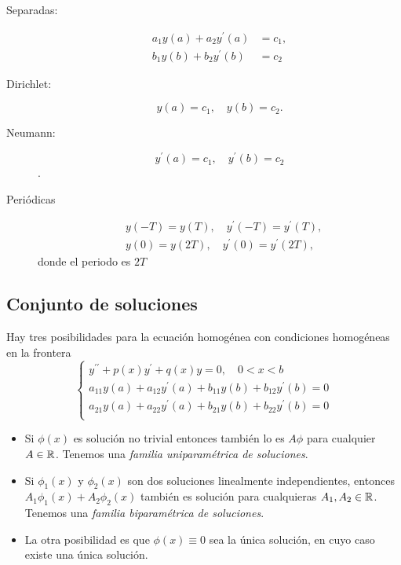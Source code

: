 \begin{description}
 \item[Separadas:]
 \[\begin{split}
    a_{1} y(a)+a_{2} y^{\prime}(a)&=c_{1},\\
    b_{1} y(b)+b_{2} y^{\prime}(b)&=c_{2}
   \end{split}
\]
\item[Dirichlet:] $$y(a)=c_{1},\quad y(b)=c_{2} .$$
\item[Neumann:] $$y^{\prime}(a)=c_{1},\quad y^{\prime}(b)=c_{2}$$.
\item[Periódicas] 
$$
\begin{aligned}
&y(-T)=y(T), \quad y^{\prime}(-T)=y^{\prime}(T), \\
&y(0)=y(2 T), \quad y^{\prime}(0)=y^{\prime}(2 T),
\end{aligned}
$$
donde el periodo es $2 T$
\end{description}



\subsection{Conjunto de soluciones}
 

Hay tres posibilidades para la ecuación homogénea con condiciones homogéneas en la frontera
\[
 \left\{
        \begin{array}{l}
            y^{\prime \prime}+p(x) y^{\prime}+q(x) y=0, \quad 0<x<b\\
            a_{11} y(a)+a_{12} y^{\prime}(a)+b_{11} y(b)+b_{12} y^{\prime}(b)=0\\
            a_{21} y(a)+a_{22} y^{\prime}(a)+b_{21} y(b)+b_{22} y^{\prime}(b)=0\\ 
         \end{array}
 \right.
\]

\begin{itemize}


\item Si $\phi(x)$ es solución no trivial  entonces también lo es $A \phi$ para cualquier  $A\in\mathbb{R}$. Tenemos una \emph{familia uniparamétrica de soluciones}.


\item Si $\phi_{1}(x)$ y $\phi_{2}(x)$ son  dos soluciones linealmente independientes, entonces $A_{1} \phi_{1}(x)+A_{2} \phi_{2}(x)$ también es solución para cualquieras  $A_{1}, A_{2}\in\mathbb{R}$. Tenemos una \emph{familia biparamétrica de soluciones}.


\item La otra posibilidad es que $\phi(x) \equiv 0$ sea la única solución, en cuyo caso existe una única solución. 

\end{itemize} 

